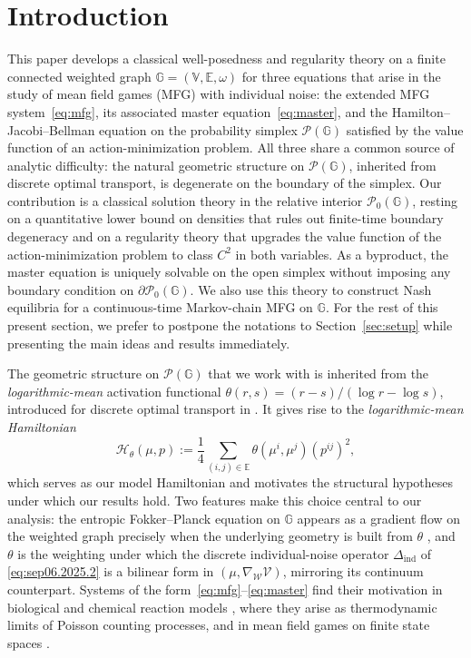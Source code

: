 \documentclass[10pt]{article}
\numberwithin{equation}{section}
\newcommand{\cH}{ \mathcal{H}}
\newcommand{\cP}{ \mathcal{P}}
\newcommand{\cV}{ \mathcal{V}}
\newcommand{\cW}{ \mathcal{W}}
\newcommand{\bE}{\mathbb E}
\newcommand{\bG}{\mathbb G}
\newcommand{\bV}{\mathbb V}
\def\cH{\mathcal{H}}
\def\G{\mathbb{G}}
\begin{document}
%
%				
\section{Introduction}\label{sec:introd}


This paper develops a classical well-posedness and regularity theory on a finite connected weighted graph $\bG=(\bV,\bE,\omega)$ for three equations that arise in the study of mean field games (MFG) with individual noise: the extended MFG system~\eqref{eq:mfg}, its associated master equation~\eqref{eq:master}, and the Hamilton--Jacobi--Bellman equation on the probability simplex $\cP(\bG)$ satisfied by the value function of an action-minimization problem. All three share a common source of analytic difficulty: the natural geometric structure on $\cP(\bG)$, inherited from discrete optimal transport, is degenerate on the boundary of the simplex. Our contribution is a classical solution theory in the relative interior $\cP_0(\G)$, resting on a quantitative lower bound on densities that rules out finite-time boundary degeneracy and on a regularity theory that upgrades the value function of the action-minimization problem to class $C^2$ in both variables. As a byproduct, the master equation is uniquely solvable on the open simplex without imposing any boundary condition on $\partial\cP_0(\G)$. We also use this theory to construct Nash equilibria for a continuous-time Markov-chain MFG on $\bG$. For the rest of this present section, we prefer to postpone the notations to Section~\ref{sec:setup} while presenting the main ideas and results immediately.

The geometric structure on $\cP(\bG)$ that we work with is inherited from the \emph{logarithmic-mean} activation functional $\theta(r,s)=(r-s)/(\log r-\log s)$, introduced for discrete optimal transport in \cite{chow2012,li_2017}. It gives rise to the \emph{logarithmic-mean Hamiltonian}
\[
\cH_\theta(\mu,p):=\frac 1 4 \sum_{(i,j)\in\bE}\theta(\mu^i,\mu^j)(p^{ij})^2,
\]
which serves as our model Hamiltonian and motivates the structural hypotheses under which our results hold. Two features make this choice central to our analysis: the entropic Fokker--Planck equation on $\bG$ appears as a gradient flow on the weighted graph precisely when the underlying geometry is built from $\theta$ \cite{ErbasMW}, and $\theta$ is the weighting under which the discrete individual-noise operator $\Delta_{\text{ind}}$ of \eqref{eq:sep06.2025.2} is a bilinear form in $(\mu,\nabla_\cW\cV)$, mirroring its continuum counterpart. Systems of the form~\eqref{eq:mfg}--\eqref{eq:master} find their motivation in biological and chemical reaction models \cite{GaoLiu,GaoLiLiu2}, where they arise as thermodynamic limits of Poisson counting processes, and in mean field games on finite state spaces \cite{CardialaguetDLL,GangboMMZ22,HuangMC}.
\end{document}
